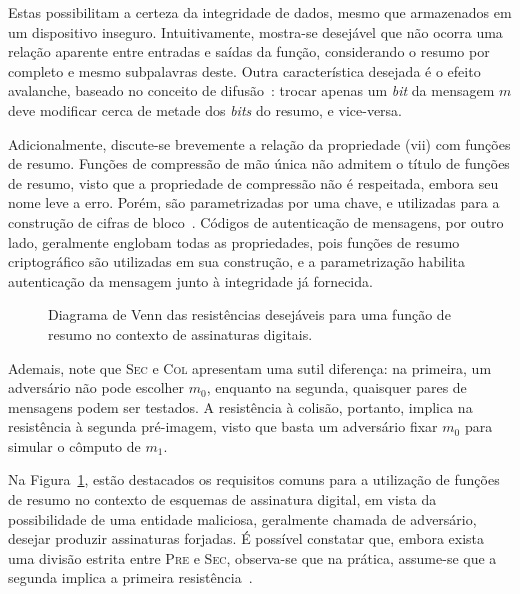 \documentclass{ufsctex/ufsctex}
\begin{document}
Estas possibilitam a certeza da integridade de dados, mesmo que armazenados em
um dispositivo inseguro. Intuitivamente, mostra-se desejável que não ocorra uma
relação aparente entre entradas e saídas da função, considerando o resumo por
completo e mesmo subpalavras deste. Outra característica desejada é o
efeito avalanche, baseado no conceito de difusão~\cite[pp.
72]{Stallings:book:2010}: trocar apenas um \emph{bit} da mensagem $m$ deve
modificar cerca de metade dos \emph{bits} do resumo, e vice-versa.

Adicionalmente, discute-se brevemente a relação da propriedade (vii) com
funções de resumo. Funções de compressão de mão única não admitem o título de
funções de resumo, visto que a propriedade de compressão não é respeitada,
embora seu nome leve a erro. Porém, são parametrizadas por uma chave, e
utilizadas para a construção de cifras de bloco~\cite[Algoritmo
9.25]{Menezes:book:1996}. Códigos de autenticação de mensagens, por outro lado,
geralmente englobam todas as propriedades, pois funções de resumo criptográfico
são utilizadas em sua construção, e a parametrização habilita autenticação da
mensagem junto à integridade já fornecida.

\begin{figure}[ht]
  \centering
  \caption{Diagrama de Venn das resistências desejáveis para uma função de
    resumo no contexto de assinaturas digitais.}\label{fig:1}
\end{figure}

Ademais, note que \textsc{Sec} e \textsc{Col} apresentam uma sutil diferença:
na primeira, um adversário não pode escolher $m_0$, enquanto na segunda,
quaisquer pares de mensagens podem ser testados. A resistência à colisão,
portanto, implica na resistência à segunda pré-imagem, visto que basta um
adversário fixar $m_0$ para simular o cômputo de $m_1$.

Na Figura~\ref{fig:1}, estão destacados os requisitos comuns para a utilização
de funções de resumo no contexto de esquemas de assinatura digital, em vista da
possibilidade de uma entidade maliciosa, geralmente chamada de adversário,
desejar produzir assinaturas forjadas. É possível constatar que, embora exista
uma divisão estrita entre \textsc{Pre} e \textsc{Sec}, observa-se que na
prática, assume-se que a segunda implica a primeira resistência~\cite[Nota
9.20]{Menezes:book:1996}.
\end{document}
